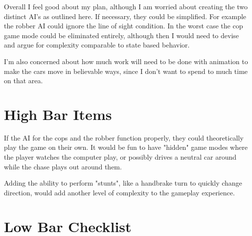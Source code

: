 \documentclass[12pt]{article}
\begin{document}
Overall I feel good about my plan, although I am worried about creating the two distinct AI's as outlined here. If necessary, they could be simplified. For example the robber AI could ignore the line of sight condition. In the worst case the cop game mode could be eliminated entirely, although then I would need to devise and argue for complexity comparable to state based behavior.

\par I'm also concerned about how much work will need to be done with animation to make the cars move in believable ways, since I don't want to spend to much time on that area.

\section{High Bar Items}

If the AI for the cops and the robber function properly, they could theoretically play the game on their own. It would be fun to have "hidden" game modes where the player watches the computer play, or possibly drives a neutral car around while the chase plays out around them.

\par Adding the ability to perform "stunts", like a handbrake turn to quickly change direction, would add another level of complexity to the gameplay experience.

\newpage

\section{Low Bar Checklist}
\end{document}
